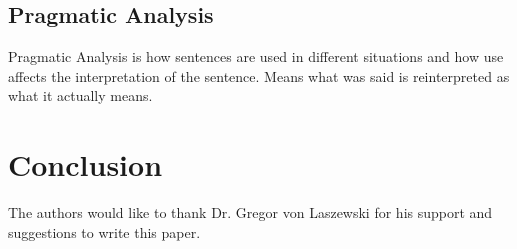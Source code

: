 \documentclass[sigconf]{acmart}
\begin{document}
\subsection{Pragmatic Analysis}
Pragmatic Analysis is how sentences are used in different situations and how use affects the interpretation of the sentence. Means what was said is reinterpreted as what it actually means.
\section{Conclusion}



\begin{acks}

  The authors would like to thank Dr. Gregor von Laszewski for his support and suggestions to write this paper.

\end{acks}


 

\appendix
\end{document}
